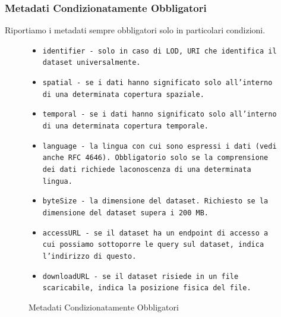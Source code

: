 \documentclass[8pt]{beamer}
\begin{document}
\begin{frame}
  \frametitle{Metadati Condizionatamente Obbligatori}

  Riportiamo i metadati sempre obbligatori solo in particolari condizioni.
  
  \begin{figure}
    \begin{itemize}[<+->]
    \item \tt{identifier} - solo in caso di LOD, URI che identifica il dataset universalmente.
    \item \tt{spatial} - se i dati hanno significato solo all'interno di una determinata copertura spaziale. 
    \item \tt{temporal} - se i dati hanno significato solo all'interno di una determinata copertura temporale.
    \item \tt{language} - la lingua con cui sono espressi i dati (vedi anche RFC 4646). Obbligatorio solo se 
      la comprensione dei dati richiede laconoscenza di una determinata lingua.
    \item \tt{byteSize} - la dimensione del dataset. Richiesto se la dimensione del dataset supera i 200 MB.
    \item \tt{accessURL} - se il dataset ha un endpoint di accesso  a cui possiamo
    sottoporre le query sul dataset, indica l'indirizzo di questo.
    \item \tt{downloadURL} - se il dataset risiede in un file scaricabile, indica la posizione fisica del file.
    \end{itemize}
    \caption{Metadati Condizionatamente Obbligatori}
  \end{figure}
\end{frame}
\end{document}
